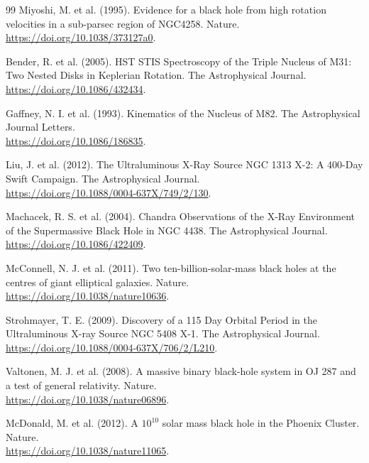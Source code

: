 \documentclass[11pt, a4paper]{article}
\begin{document}
\begin{thebibliography}{99}
  Miyoshi, M. et al. (1995). Evidence for a black hole from high rotation velocities in a sub-parsec region of NGC4258. Nature. \\ \url{https://doi.org/10.1038/373127a0}.

  Bender, R. et al. (2005). HST STIS Spectroscopy of the Triple Nucleus of M31: Two Nested Disks in Keplerian Rotation. The Astrophysical Journal. \\ \url{https://doi.org/10.1086/432434}.

  Gaffney, N. I. et al. (1993). Kinematics of the Nucleus of M82. The Astrophysical Journal Letters. \\ \url{https://doi.org/10.1086/186835}.

  Liu, J. et al. (2012). The Ultraluminous X-Ray Source NGC 1313 X-2: A 400-Day Swift Campaign. The Astrophysical Journal. \\ \url{https://doi.org/10.1088/0004-637X/749/2/130}.

  Machacek, R. S. et al. (2004). Chandra Observations of the X-Ray Environment of the Supermassive Black Hole in NGC 4438. The Astrophysical Journal. \\ \url{https://doi.org/10.1086/422409}.

  McConnell, N. J. et al. (2011). Two ten-billion-solar-mass black holes at the centres of giant elliptical galaxies. Nature. \\ \url{https://doi.org/10.1038/nature10636}.

  Strohmayer, T. E. (2009). Discovery of a 115 Day Orbital Period in the Ultraluminous X-ray Source NGC 5408 X-1. The Astrophysical Journal. \\ \url{https://doi.org/10.1088/0004-637X/706/2/L210}.

  Valtonen, M. J. et al. (2008). A massive binary black-hole system in OJ 287 and a test of general relativity. Nature. \\ \url{https://doi.org/10.1038/nature06896}.

  McDonald, M. et al. (2012). A $10^{10}$ solar mass black hole in the Phoenix Cluster. Nature. \\ \url{https://doi.org/10.1038/nature11065}.


\end{thebibliography}
\end{document}
